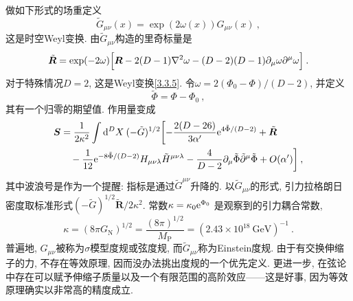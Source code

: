 做如下形式的场重定义 
\begin{equation}
\tilde{G}_{\mu \nu}(x)=\exp (2 \omega(x)) G_{\mu \nu}(x) \:, \label{3.7.22}
\end{equation}
这是时空Weyl变换. 由$\tilde{G}_{\mu \nu}$构造的里奇标量是
\begin{equation}
\tilde{\bm{R}}=\exp (-2 \omega)\Bigl[\bm{R}-2(D-1) \nabla^{2} \omega-(D-2)(D-1) \partial_{\mu} \omega \partial^{\mu} \omega\Bigr] \:. \label{3.7.23}
\end{equation}
对于特殊情况$D=2$, 这是Weyl变换\eqref{3.3.5}. 令$\omega=2(\Phi_{0}-\Phi) /(D-2)$, 并定义
\begin{equation}
\tilde{\Phi}=\Phi-\Phi_{0} \:, \label{3.7.24}
\end{equation}
其有一个归零的期望值. 作用量变成
\begin{align}
\bm{S} &= \frac{1}{2 \kappa^{2}} \int \mathrm{d}^{D} X\: (-\tilde{G})^{1 / 2}\biggl[-\frac{2(D-26)}{3 \alpha^{\prime}} \mathrm{e}^{4 \tilde{\Phi} /(D-2)}+\tilde{\bm{R}} \nonumber \\
&\quad -\frac{1}{12} \mathrm{e}^{-8 \tilde{\Phi} /(D-2)} H_{\mu \nu \lambda} \tilde{H}^{\mu \nu \lambda}-\frac{4}{D-2} \partial_{\mu} \tilde{\Phi} \tilde{\partial}^{\mu} \tilde{\Phi}+O(\alpha^{\prime})\biggr] \:, \label{3.7.25}
\end{align}
其中波浪号是作为一个提醒: 指标是通过$\tilde{G}^{\mu \nu}$升降的. 以$\tilde{G}_{\mu \nu}$的形式, 引力拉格朗日密度取标准形式$(-\tilde{G})^{1 / 2} \tilde{\bm{R}} / 2 \kappa^{2}$. 常数$\kappa=\kappa_{0} \mathrm{e}^{\Phi_{0}}$ 是观察到的引力耦合常数,
\begin{equation}
\kappa= (8 \pi G_{\mathrm{N}})^{1 / 2}=\frac{(8 \pi)^{1 / 2}}{M_{\mathrm{P}}}=(2.43 \times 10^{18} \:\mathrm{GeV})^{-1} \:. \label{3.7.26}
\end{equation}
普遍地,  $G_{\mu \nu}$被称为$\sigma$模型度规或弦度规, 而$\tilde{G}_{\mu \nu}$称为Einstein度规. 由于有交换伸缩子的力, 不存在等效原理, 因而没办法挑出度规的一个优先定义. 更进一步, 在弦论中存在可以赋予伸缩子质量以及一个有限范围的高阶效应——这是好事, 因为等效原理确实以非常高的精度成立.


